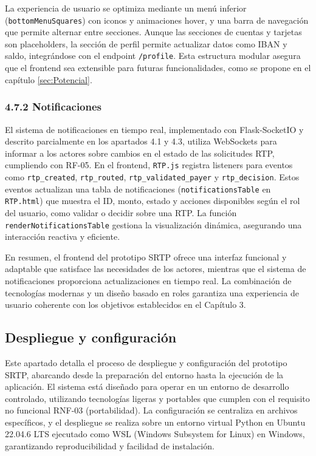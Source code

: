 La experiencia de usuario se optimiza mediante un menú inferior (\texttt{bottomMenuSquares}) con iconos y animaciones hover, y una barra de navegación que permite alternar entre secciones. Aunque las secciones de cuentas y tarjetas son placeholders, la sección de perfil permite actualizar datos como IBAN y saldo, integrándose con el endpoint \texttt{/profile}. Esta estructura modular asegura que el frontend sea extensible para futuras funcionalidades, como se propone en el capítulo \ref{sec:Potencial}.

\subsubsection*{4.7.2 \; Notificaciones}

El sistema de notificaciones en tiempo real, implementado con Flask-SocketIO y descrito parcialmente en los apartados 4.1 y 4.3, utiliza WebSockets para informar a los actores sobre cambios en el estado de las solicitudes RTP, cumpliendo con RF-05. En el frontend, \texttt{RTP.js} registra listeners para eventos como \texttt{rtp\_created}, \texttt{rtp\_routed}, \texttt{rtp\_validated\_payer} y \texttt{rtp\_decision}. Estos eventos actualizan una tabla de notificaciones (\texttt{notificationsTable} en \texttt{RTP.html}) que muestra el ID, monto, estado y acciones disponibles según el rol del usuario, como validar o decidir sobre una RTP. La función \texttt{renderNotificationsTable} gestiona la visualización dinámica, asegurando una interacción reactiva y eficiente.

En resumen, el frontend del prototipo SRTP ofrece una interfaz funcional y adaptable que satisface las necesidades de los actores, mientras que el sistema de notificaciones proporciona actualizaciones en tiempo real. La combinación de tecnologías modernas y un diseño basado en roles garantiza una experiencia de usuario coherente con los objetivos establecidos en el Capítulo 3.

\subsection{Despliegue y configuración}
\label{subsec:despliegue}

Este apartado detalla el proceso de despliegue y configuración del prototipo SRTP, abarcando desde la preparación del entorno hasta la ejecución de la aplicación. El sistema está diseñado para operar en un entorno de desarrollo controlado, utilizando tecnologías ligeras y portables que cumplen con el requisito no funcional RNF-03 (portabilidad). La configuración se centraliza en archivos específicos, y el despliegue se realiza sobre un entorno virtual Python en Ubuntu 22.04.6 LTS ejecutado como WSL (Windows Subsystem for Linux) en Windows, garantizando reproducibilidad y facilidad de instalación.

